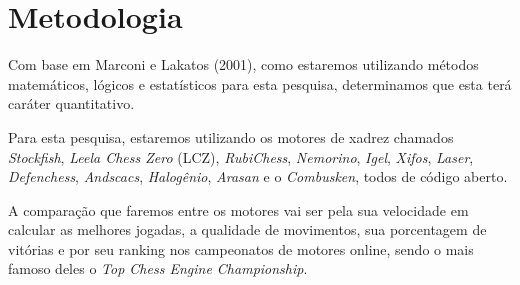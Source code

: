 


\chapter{Metodologia}
Com base em Marconi e Lakatos (2001), como estaremos utilizando métodos matemáticos, lógicos e estatísticos para esta pesquisa,
determinamos que esta terá caráter quantitativo.

Para esta pesquisa, estaremos utilizando os motores de xadrez chamados \textit{Stockfish}, \textit{Leela Chess Zero} (LCZ),
\textit{RubiChess}, \textit{Nemorino}, \textit{Igel}, \textit{Xifos}, \textit{Laser}, \textit{Defenchess}, \textit{Andscacs},
\textit{Halogênio}, \textit{Arasan} e o \textit{Combusken}, todos de código aberto.

A comparação que faremos entre os motores vai ser pela sua velocidade em calcular as melhores jogadas, a qualidade de movimentos,
sua porcentagem de vitórias e por seu ranking nos campeonatos de motores online, sendo o mais famoso deles o \textit{Top Chess Engine Championship}.
